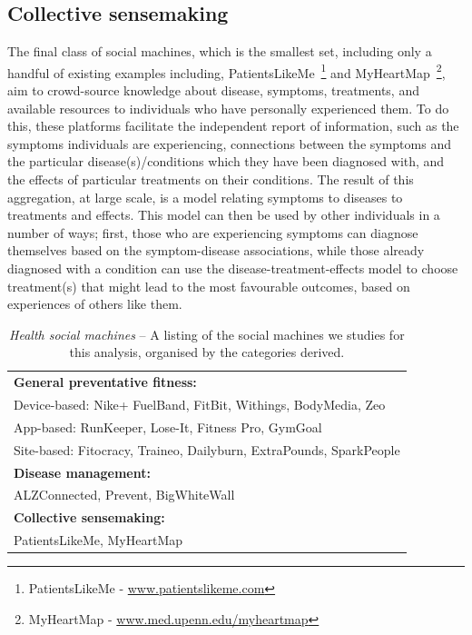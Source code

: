 \documentclass{www13-companion-accepted}
\begin{document}
\subsection{Collective sensemaking}
The final class of social machines, which is the smallest set,
including only a handful of existing examples including,
PatientsLikeMe~\footnote{PatientsLikeMe -
  \url{www.patientslikeme.com}} and MyHeartMap~\footnote{MyHeartMap -
  \url{www.med.upenn.edu/myheartmap}}, aim to crowd-source knowledge
about disease, symptoms, treatments, and available resources to
individuals who have personally experienced them.  To do this, these
platforms facilitate the independent report of information, such as
the symptoms individuals are experiencing, connections between the
symptoms and the particular disease(s)/conditions which they have been
diagnosed with, and the effects of particular treatments on their
conditions.  The result of this aggregation, at large scale, is a
model relating symptoms to diseases to treatments and effects.  This
model can then be used by other individuals in a number of ways;
first, those who are experiencing symptoms can diagnose themselves
based on the symptom-disease associations, while those already
diagnosed with a condition can use the disease-treatment-effects model
to choose treatment(s) that might lead to the most favourable
outcomes, based on experiences of others like them.

\begin{table}[tb]
\begin{center}
\begin{tabular}{|p{8cm}|}
\hline
{\bf General preventative fitness:} \\
Device-based: Nike+ FuelBand, FitBit, Withings, BodyMedia, Zeo \\
App-based: RunKeeper, Lose-It, Fitness Pro, GymGoal \\
Site-based: Fitocracy, Traineo, Dailyburn, ExtraPounds, SparkPeople  \\
\hline
{\bf Disease management:} \\
ALZConnected, Prevent, BigWhiteWall \\
\hline
{\bf Collective sensemaking:} \\
PatientsLikeMe, MyHeartMap \\
\hline
\end{tabular}
\end{center}
\caption{\emph{Health social machines} -- A listing of the social
  machines we studies for this analysis, organised by the categories
  derived.} \label{table:clusters}
\end{table}
\end{document}
